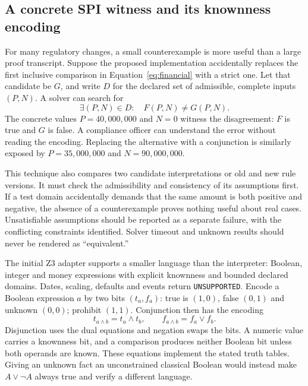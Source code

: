 \subsection{A concrete SPI witness and its knownness encoding}
\label{merge:P-03-product:06}


For many regulatory changes, a small counterexample is more useful than a large
proof transcript. Suppose the proposed implementation accidentally replaces the
first inclusive comparison in Equation~\eqref{eq:financial} with a strict one.
Let that candidate be $G$, and write $D$ for the declared set of admissible,
complete inputs $(P,N)$. A solver can search for
\begin{equation}
 \exists (P,N)\in D:\quad F(P,N)\ne G(P,N).
 \label{eq:counterexample}
\end{equation}
The concrete values $P=40{,}000{,}000$ and $N=0$ witness the disagreement:
$F$ is true and $G$ is false. A compliance officer can understand the error
without reading the encoding. Replacing the alternative with a conjunction is
similarly exposed by $P=35{,}000{,}000$ and $N=90{,}000{,}000$.

This technique also compares two candidate interpretations or old and new rule
versions. It must check the admissibility and consistency of its assumptions
first. If a test domain accidentally demands that the same amount is both
positive and negative, the absence of a counterexample proves nothing useful
about real cases. Unsatisfiable assumptions should be reported as a separate
failure, with the conflicting constraints identified. Solver timeout and unknown
results should never be rendered as ``equivalent.''


The initial Z3 adapter supports a smaller language than the interpreter:
Boolean, integer and money expressions with explicit knownness and bounded
declared domains. Dates, scaling, defaults and events return
\texttt{UNSUPPORTED}. Encode a Boolean expression $a$ by two bits $(t_a,f_a)$:
true is $(1,0)$, false $(0,1)$ and unknown $(0,0)$; prohibit $(1,1)$.
Conjunction then has the encoding
\begin{equation}
 t_{a\land b}=t_a\land t_b,\qquad
 f_{a\land b}=f_a\lor f_b.
 \label{eq:knownness}
\end{equation}
Disjunction uses the dual equations and negation swaps the bits. A numeric value
carries a knownness bit, and a comparison produces neither Boolean bit unless
both operands are known. These equations implement the stated truth tables.
Giving an unknown fact an unconstrained classical Boolean would instead make
$A\lor\neg A$ always true and verify a different language.


